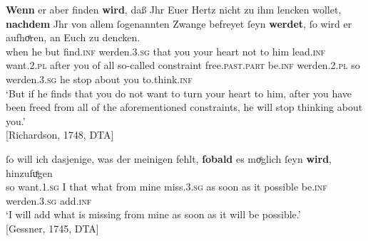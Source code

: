 \documentclass[output=paper,colorlinks,citecolor=brown]{langscibook}
\begin{document}
\ea \label{ex:smirnova:9}
\gll \textbf{Wenn} er aber finden \textbf{wird}, daß Jhr Euer Hertz nicht zu ihm lencken wollet, \textbf{nachdem} Jhr von allem ſogenannten Zwange befreyet ſeyn \textbf{werdet}, ſo wird er aufhoͤren, an Euch {zu dencken}. \\
	 when he but find.\textsc{inf} werden.\textsc{3.sg} that you your heart not to him lead.\textsc{inf} want.\textsc{2.pl} after you of all so-called constraint free.\textsc{past.part} be.\textsc{inf} werden.\textsc{2.pl} so werden.\textsc{3.sg} he stop about you to.think.\textsc{inf} \\
\glt `But if he finds that you do not want to turn your heart to him, after you have been freed from all of the aforementioned constraints, he will stop thinking about you.'\\
\hfill [Richardson, 1748, DTA]
\z

\ea \label{ex:smirnova:10}
\gll ſo will ich dasjenige, was der meinigen fehlt, \textbf{ſobald} es moͤglich ſeyn \textbf{wird}, hinzufuͤgen \\
	 so want.\textsc{1.sg} I that what from mine miss.\textsc{3.sg} {as soon as} it possible be.\textsc{inf} werden.\textsc{3.sg} add.\textsc{inf} \\
\glt `I will add what is missing from mine as soon as it will be possible.'\\
\hfill [Gessner, 1745, DTA]
\z
 
\end{document}
